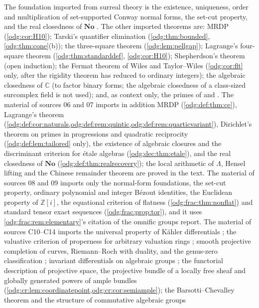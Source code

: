 \documentclass[11pt,oneside]{article}
\numberwithin{equation}{section}
\theoremstyle{definition}
\theoremstyle{remark}
\newcommand{\No}{\mathbf{No}}
\newcommand{\Z}{\mathbb Z}
\newcommand{\C}{\mathbb C}
\begin{document}
The foundation imported from surreal theory is the existence, uniqueness,
order and multiplication of set-supported Conway normal forms, the set-cut
property, and the real closedness of $\No$ \cite{Conway,Gonshor}. The other
imported theorems are: MRDP (\cref{odg:cor:H10}); Tarski's quantifier
elimination (\cref{odg:thm:bounded}, \cref{odg:thm:cone}(b)); the three-square
theorem (\cref{odg:lem:pellgap}); Lagrange's four-square theorem
(\cref{odg:thm:standarddef}, \cref{odg:cor:H10}); Shepherdson's theorem (open
induction); the Fermat theorem of Wiles and Taylor--Wiles
(\cref{odg:cor:flt} only, after the rigidity theorem has reduced to ordinary
integers); the algebraic closedness of $\C$ (to factor binary forms; the
algebraic closedness of a class-sized surcomplex field is not used); and, as
context only, the primes of \cite{LM} and \cite[Lemma 11.1]{EK}. The material
of sources 06 and 07 imports in addition MRDP (\cref{odg:def:thm:ce}),
Lagrange's theorem (\cref{odg:def:cor:naturals,odg:def:rem:quintic,odg:def:rem:quarticvariant}),
Dirichlet's theorem on primes in progressions and quadratic reciprocity
(\cref{odg:def:lem:tailored} only), the existence of algebraic closures and
the discriminant criterion for \'etale algebras (\cref{odg:dec:thm:etale}), and
the real closedness of $\No$ (\cref{odg:def:thm:realrecovery}); the local
arithmetic of $\Lambda$, Hensel lifting and the Chinese remainder theorem are
proved in the text. The material of sources 08 and 09 imports only the
normal-form foundations, the set-cut property, ordinary polynomial and integer
B\'ezout identities, the Euclidean property of $\Z[i]$, the equational
criterion of flatness \cite[Tag 00HK]{StacksFlat} (\cref{odg:frac:thm:nonflat})
and standard tensor exact sequences (\cref{odg:frac:prop:tor}), and it uses
\cref{odg:frac:rem:elementary}'s citation of the omnific groups report.
The material of sources C10--C14 imports the universal property of K\"ahler
differentials \cite[Tag 00RM]{StacksDiff}; the valuative criterion of properness for
arbitrary valuation rings \cite[Tag 0BX5]{StacksProper}; smooth projective completion
of curves, Riemann--Roch with duality, and the genus-zero classification
\cite{StacksCurves,StacksRR,StacksGenusZero}; invariant differentials on algebraic groups
\cite{StacksGroups,MilneAV}; the functorial description of projective space, the
projective bundle of a locally free sheaf and globally generated powers of ample bundles
\cite{StacksProjSpace,StacksProjBundle,StacksAmple} (\cref{odg:cr:lem:coordinatepoint,odg:cr:cor:semiample});
the Barsotti--Chevalley theorem and the structure of commutative algebraic groups
\end{document}
